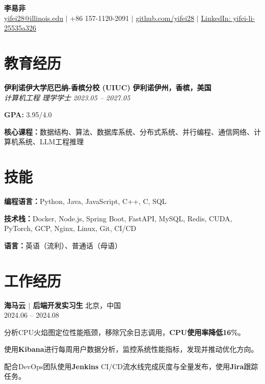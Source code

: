\documentclass[10pt, a4paper]{article}
\newcommand{\resumeItem}[1]{
  \item\small{
    {#1 \vspace{-1pt}}
  }
}
\newcommand{\resumeSubheading}[4]{
  \textbf{#1} \hfill \small{\textbf{#2}} \\
  \textit{\small#3} \hfill \small{\textit{#4}}
}
\newcommand{\resumeSubheadingItalic}[4]{
  \textbf{\large #1} \hfill \small{#2} \\
  \small{#3} \hfill \small{#4}
  \vspace{2pt}
}
\begin{document}
\begin{center}
  {\LARGE \textbf{李易非}} \\ \vspace{4pt}
  \small \href{mailto:yifei28@illinois.edu}{yifei28@illinois.edu} $|$ +86 157-1120-2091 $|$ \href{https://github.com/yifei28}{github.com/yifei28} $|$ \href{https://www.linkedin.com/in/yifei-li-25535a326/}{LinkedIn: yifei-li-25535a326}
\end{center}
\vspace{2pt}

\section{教育经历}
\vspace{-2pt}
\begin{resumeItemList}
  \item \resumeSubheading
  {伊利诺伊大学厄巴纳-香槟分校 (UIUC)}{伊利诺伊州，香槟，美国}
  {计算机工程 理学学士}{2023.05 -- 2027.05}
  \vspace{2pt}
  \item \small{\textbf{GPA:} 3.95/4.0}
  \item \small{\textbf{核心课程：}数据结构、算法、数据库系统、分布式系统、并行编程、通信网络、计算机系统、LLM工程推理}
\end{resumeItemList}

\section{技能}
\vspace{-2pt}
\begin{resumeItemList}
  \item \small{\textbf{编程语言：}Python, Java, JavaScript, C++, C, SQL}
  \item \small{\textbf{技术栈：}Docker, Node.js, Spring Boot, FastAPI, MySQL, Redis, CUDA, PyTorch, GCP, Nginx, Linux, Git, CI/CD}
  \item \small{\textbf{语言：}英语（流利）、普通话（母语）}
\end{resumeItemList}

\section{工作经历}
\vspace{-2pt}
\resumeSubheadingItalic
{海马云 $|$ 后端开发实习生}{北京，中国}
{2024.06 -- 2024.08}{}
\begin{resumeItemList}
  \resumeItem{分析CPU火焰图定位性能瓶颈，移除冗余日志调用，\textbf{CPU使用率降低16\%}。}
  \resumeItem{使用\textbf{Kibana}进行每周用户数据分析，监控系统性能指标，发现并推动优化方向。}
  \resumeItem{配合DevOps团队使用\textbf{Jenkins} CI/CD流水线完成灰度与全量发布，使用\textbf{Jira}跟踪任务。}
\end{resumeItemList}
\vspace{12pt}
\end{document}
